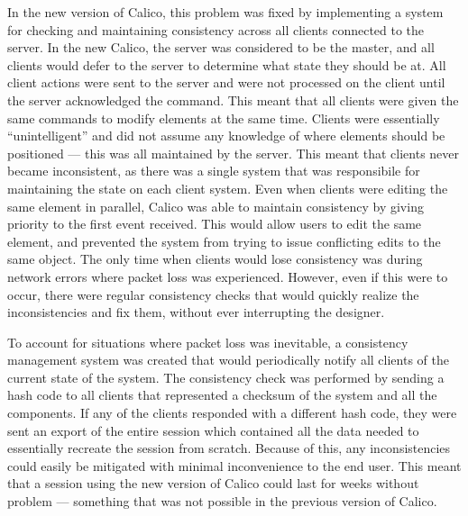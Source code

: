 In the new version of Calico, this problem was fixed by implementing a system for checking and maintaining consistency across all clients connected to the server. In the new Calico, the server was considered to be the master, and all clients would defer to the server to determine what state they should be at. All client actions were sent to the server and were not processed on the client until the server acknowledged the command. This meant that all clients were given the same commands to modify elements at the same time. Clients were essentially ``unintelligent'' and did not assume any knowledge of where elements should be positioned --- this was all maintained by the server. This meant that clients never became inconsistent, as there was a single system that was responsibile for maintaining the state on each client system. 
Even when clients were editing the same element in parallel, Calico was able to maintain consistency by giving priority to the first event received. This would allow users to edit the same element, and prevented the system from trying to issue conflicting edits to the same object.
The only time when clients would lose consistency was during network errors where packet loss was experienced. However, even if this were to occur, there were regular consistency checks that would quickly realize the inconsistencies and fix them, without ever interrupting the designer.

To account for situations where packet loss was inevitable, a consistency management system was created that would periodically notify all clients of the current state of the system. The consistency check was performed by sending a hash code to all clients that represented a checksum of the system and all the components. If any of the clients responded with a different hash code, they were sent an export of the entire session which contained all the data needed to essentially recreate the session from scratch. Because of this, any inconsistencies could easily be mitigated with minimal inconvenience to the end user. This meant that a session using the new version of Calico could last for weeks without problem --- something that was not possible in the previous version of Calico.






